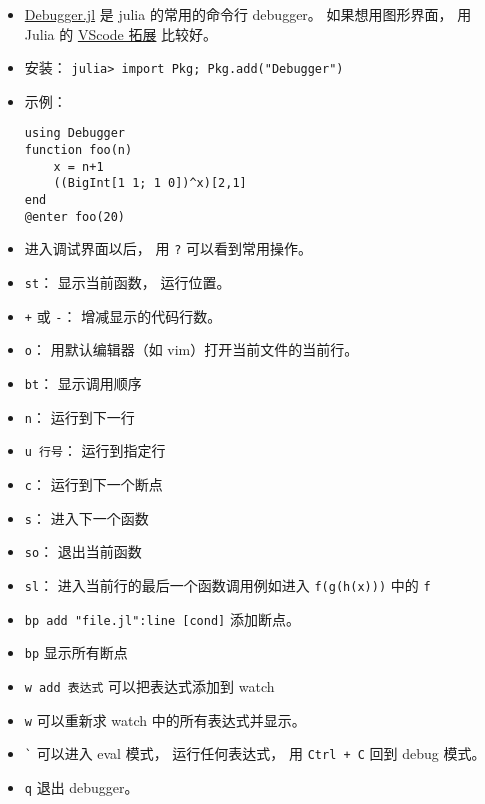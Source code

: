 
\begin{issues}
\issueDraft
\end{issues}

\begin{itemize}
\item \href{https://github.com/JuliaDebug/Debugger.jl}{Debugger.jl} 是 julia 的常用的命令行 debugger。 如果想用图形界面， 用 Julia 的 \href{https://www.julia-vscode.org}{VScode 拓展} 比较好。
\item 安装： \verb|julia> import Pkg; Pkg.add("Debugger")|
\item 示例：
\begin{lstlisting}[language=none]
using Debugger
function foo(n)
    x = n+1
    ((BigInt[1 1; 1 0])^x)[2,1]
end
@enter foo(20)
\end{lstlisting}
\item 进入调试界面以后， 用 \verb|?| 可以看到常用操作。
\item \verb|st|： 显示当前函数， 运行位置。
\item \verb|+| 或 \verb|-|： 增减显示的代码行数。
\item \verb|o|： 用默认编辑器（如 vim）打开当前文件的当前行。
\item \verb|bt|： 显示调用顺序
\item \verb|n|： 运行到下一行
\item \verb|u 行号|： 运行到指定行
\item \verb|c|： 运行到下一个断点
\item \verb|s|： 进入下一个函数
\item \verb|so|： 退出当前函数
\item \verb|sl|： 进入当前行的最后一个函数调用例如进入 \verb|f(g(h(x)))| 中的 \verb|f|
\item \verb|bp add "file.jl":line [cond]| 添加断点。
\item \verb|bp| 显示所有断点
\item \verb|w add 表达式| 可以把表达式添加到 watch
\item \verb|w| 可以重新求 watch 中的所有表达式并显示。
\item \verb|`| 可以进入 eval 模式， 运行任何表达式， 用 \verb|Ctrl + C| 回到 debug 模式。
\item \verb|q| 退出 debugger。
\end{itemize}
